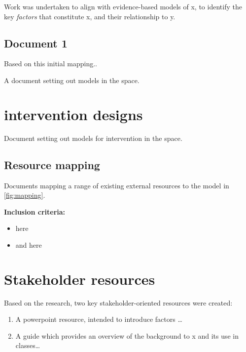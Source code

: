 \documentclass[
]{book}
\providecommand{\tightlist}{%
  \setlength{\itemsep}{0pt}\setlength{\parskip}{0pt}}
\begin{document}
Work was undertaken to align with evidence-based models of x, to identify the key \emph{factors} that constitute x, and their relationship to y.

\hypertarget{document-1}{%
\subsection{Document 1}\label{document-1}}

Based on this initial mapping..

A document setting out models in the space.

\hypertarget{intervention-design}{%
\section{intervention designs}\label{intervention-design}}

Document setting out models for intervention in the space.

\hypertarget{resource-mapping}{%
\subsection{Resource mapping}\label{resource-mapping}}

Documents mapping a range of existing external resources to the model in \ref{fig:mapping}.

\label{fig:mapping}

\label{fig:factors-pdf-demo}

\textbf{Inclusion criteria:}

\begin{itemize}
\tightlist
\item
  here
\item
  and here
\end{itemize}

\hypertarget{stakeholder-resources}{%
\section{Stakeholder resources}\label{stakeholder-resources}}

Based on the research, two key stakeholder-oriented resources were created:

\begin{enumerate}
\def\labelenumi{\arabic{enumi}.}
\tightlist
\item
  A powerpoint resource, intended to introduce factors \ldots{}
\item
  A guide which provides an overview of the background to x and its use in classes\ldots{}
\end{enumerate}
\end{document}

